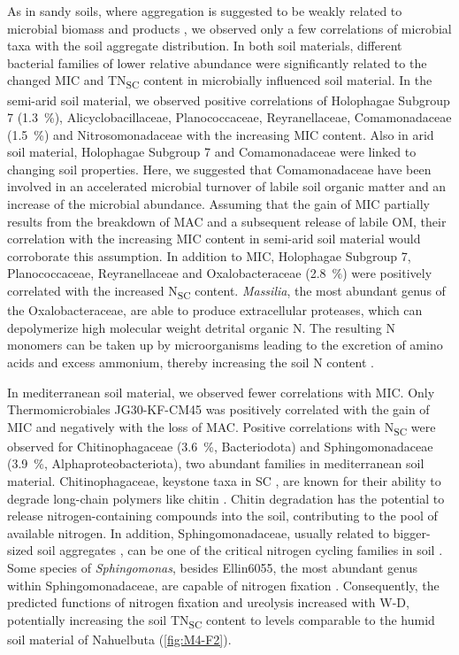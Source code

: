 As in sandy soils, where aggregation is suggested to be weakly related to microbial biomass and products \citep{Degens1996}, we observed only a few correlations of microbial taxa with the soil aggregate distribution. In both soil materials, different bacterial families of lower relative abundance were significantly related to the changed MIC and TN\textsubscript{SC} content in microbially influenced soil material. In the semi-arid soil material, we observed positive correlations of Holophagae Subgroup 7 (\SI{1.3}{\percent}), Alicyclobacillaceae, Planococcaceae, Reyranellaceae, Comamonadaceae (\SI{1.5}{\percent}) and Nitrosomonadaceae with the increasing MIC content. Also in arid soil material, Holophagae Subgroup 7 and Comamonadaceae were linked to changing soil properties. Here, we suggested that Comamonadaceae have been involved in an accelerated microbial turnover of labile soil organic matter and an increase of the microbial abundance. Assuming that the gain of MIC partially results from the breakdown of MAC and a subsequent release of labile OM, their correlation with the increasing MIC content in semi-arid soil material would corroborate this assumption. In addition to MIC, Holophagae Subgroup 7, Planococcaceae, Reyranellaceae and Oxalobacteraceae (\SI{2.8}{\percent}) were positively correlated with the increased N\textsubscript{SC} content. \textit{Massilia}, the most abundant genus of the Oxalobacteraceae, are able to produce extracellular proteases, which can depolymerize high molecular weight detrital organic N. The resulting N monomers can be taken up by microorganisms leading to the excretion of amino acids and excess ammonium, thereby increasing the soil N content \citep{Sieradzki2023}.

In mediterranean soil material, we observed fewer correlations with MIC. Only Thermomicrobiales JG30-KF-CM45 was positively correlated with the gain of MIC and negatively with the loss of MAC. Positive correlations with N\textsubscript{SC} were observed for Chitinophagaceae (\SI{3.6}{\percent}, Bacteriodota) and Sphingomonadaceae (\SI{3.9}{\percent}, Alphaproteobacteriota), two abundant families in mediterranean soil material. Chitinophagaceae, keystone taxa in SC \citep{Feng2022}, are known for their ability to degrade long-chain polymers like chitin \citep{Proenca2017}. Chitin degradation has the potential to release nitrogen-containing compounds into the soil, contributing to the pool of available nitrogen. In addition, Sphingomonadaceae, usually related to bigger-sized soil aggregates \citep{Feng2022, Yang2019}, can be one of the critical nitrogen cycling families in soil \citep{Wang2020}. Some species of \textit{Sphingomonas}, besides Ellin6055, the most abundant genus within Sphingomonadaceae, are capable of nitrogen fixation \citep{Asaf2020}. Consequently, the predicted functions of nitrogen fixation and ureolysis increased with W-D, potentially increasing the soil TN\textsubscript{SC} content to levels comparable to the humid soil material of Nahuelbuta (\ref{fig:M4-F2}).

